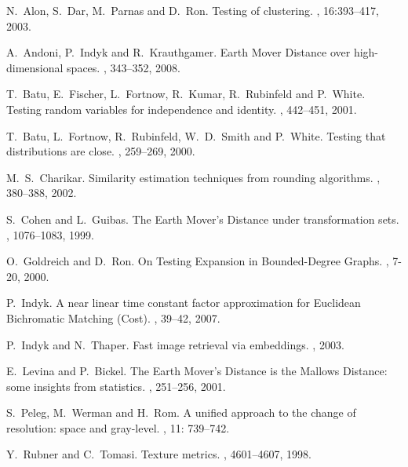 \documentclass[11pt]{article}
\begin{document}

\begin{thebibliography}{X}

N.~Alon, S.~Dar, M.~Parnas and D.~Ron.
\newblock Testing of clustering.
, 16:393--417, 2003.

A.~Andoni, P.~Indyk and R.~Krauthgamer.
\newblock Earth Mover Distance over high-dimensional spaces.
, 343--352, 2008.

T.~Batu, E.~Fischer, L.~Fortnow, R.~Kumar, R.~Rubinfeld and P.~White.
\newblock Testing random variables for independence and identity.
, 442--451, 2001.

T.~Batu, L.~Fortnow, R.~Rubinfeld, W.~D.~Smith and P.~White.
\newblock Testing that distributions are close.
, 259--269, 2000.

M.~S.~Charikar.
\newblock Similarity estimation techniques from rounding algorithms.
, 380--388, 2002.

S.~Cohen and L.~Guibas.
\newblock The Earth Mover's Distance under transformation sets.
, 1076--1083, 1999.

O.~Goldreich and D.~Ron.
\newblock On Testing Expansion in Bounded-Degree Graphs.
, 7-20, 2000.

P.~Indyk.
\newblock A near linear time constant factor approximation for Euclidean Bichromatic Matching (Cost).
, 39--42, 2007.

P.~Indyk and N.~Thaper.
\newblock Fast image retrieval via embeddings.
, 2003.

E.~Levina and P.~Bickel.
\newblock The Earth Mover's Distance is the Mallows Distance: some insights from
                                        statistics.
, 251--256, 2001.

S.~Peleg, M.~Werman and H.~Rom.
\newblock A unified approach to the change of resolution: space and gray-level.
, 11: 739--742.

Y.~Rubner and C.~Tomasi.
\newblock Texture metrics.
, 4601--4607, 1998.


\end{thebibliography}
\end{document}
